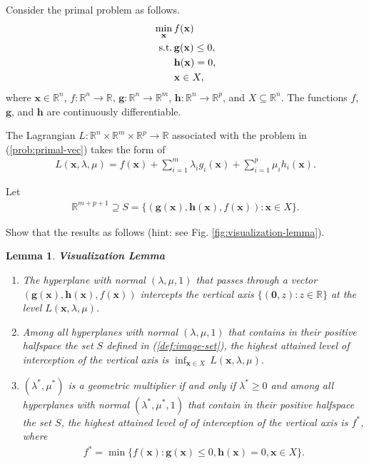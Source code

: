 \documentclass[11pt,letter,notitlepage]{article}
\newtheorem{lemma}{Lemma}
\begin{document}
\newpage
\begin{exercise}
	Consider the primal problem as follows.
	\begin{align}\label{prob:primal-vec}
		\min_{\mathbf{x}}\, & f(\mathbf{x})                \\ \nonumber
		{\rm s.t.}\,        & \mathbf{g}(\mathbf{x})\leq0, \\ \nonumber
		                    & \mathbf{h}(\mathbf{x})=0,    \\ \nonumber
		                    & \mathbf{x}\in X,
	\end{align}
	where $\mathbf{x}\in\mathbb{R}^n$, $f:\mathbb{R}^n\rightarrow\mathbb{R}$, $\mathbf{g}:\mathbb{R}^n\rightarrow\mathbb{R}^m$, $\mathbf{h}:\mathbb{R}^n\rightarrow\mathbb{R}^p$, and $X\subseteq\mathbb{R}^n$. The functions $f$, $\mathbf{g}$, and $\mathbf{h}$ are continuously differentiable.

	The Lagrangian $L:\mathbb{R}^n\times \mathbb{R}^m\times \mathbb{R}^p\rightarrow\mathbb{R}$ associated with the problem in (\ref{prob:primal-vec}) takes the form of
	\begin{align}\label{def:Lagrangian}
		L(\mathbf{x},\lambda,\mu)=f(\mathbf{x})+\sum_{i=1}^m\lambda_ig_i(\mathbf{x})+\sum_{i=1}^p\mu_ih_i(\mathbf{x}).
	\end{align}

	Let
	\begin{align}\label{def:image-set}
		\mathbb{R}^{m+p+1}\supseteq S=\{(\mathbf{g}(\mathbf{x}),\mathbf{h}(\mathbf{x}),f(\mathbf{x})):\mathbf{x}\in X\}.
	\end{align}

	Show that the results as follows (hint: see Fig. \ref{fig:visualization-lemma}).

	\begin{lemma}
		\textbf{\textup {Visualization Lemma}}
		\begin{enumerate}
			\item The hyperplane with normal $(\lambda,\mu,1)$ that passes through a vector $(\mathbf{g}(\mathbf{x}),\mathbf{h}(\mathbf{x}),f(\mathbf{x}))$ intercepts the vertical axis $\{(\mathbf{0},z):z\in\mathbb{R}\}$ at the level $L(\mathbf{x},\lambda,\mu)$.

			\item Among all hyperplanes with normal $(\lambda,\mu,1)$ that contains in their positive halfspace the set $S$ defined in (\ref{def:image-set}), the highest attained level of interception of the vertical axis is $\inf_{\mathbf{x}\in X}\,L(\mathbf{x},\lambda,\mu)$.

			\item $(\lambda^*,\mu^*)$ is a geometric multiplier if and only if $\lambda^*\geq0$ and among all hyperplanes with normal $(\lambda^*,\mu^*,1)$ that contain in their positive halfspace the set $S$, the highest attained level of of interception of the vertical axis is $f^*$, where
			      \begin{align*}
				      f^*=\min\{f(\mathbf{x}):\mathbf{g}(\mathbf{x})\leq0,\mathbf{h}(\mathbf{x})=0,\mathbf{x}\in X\}.
			      \end{align*}
		\end{enumerate}
	\end{lemma}
\end{exercise}
\end{document}
